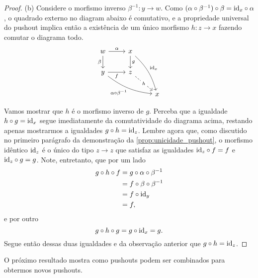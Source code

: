 \begin{proof}
    \smallskip
    (b) Considere o morfismo inverso $\beta^{-1}: y \to w$.
    Como $(\alpha \circ \beta^{-1}) \circ \beta = \mathrm{id}_x \circ \alpha$, o quadrado externo no diagram abaixo é comutativo, e a propriedade universal do pushout implica então a existência de um único morfismo $h: z \to x$ fazendo comutar o diagrama todo.
    \begin{displaymath}
        \begin{tikzcd}
            w
            \arrow[r, "\alpha"]
            \arrow[d, "\beta" swap]
            & x
            \arrow[d, "g"]
            \arrow[rdd, bend left=15, "\id_x"]
            \\ y
            \arrow[r, "f" swap]
            \arrow[rrd, bend right=15, "\alpha \circ \beta^{-1}" swap]
            & z
            \arrow[rd, dashed, "h" description]
            \\ & & x
        \end{tikzcd}
    \end{displaymath}

    Vamos mostrar que $h$ é o morfismo inverso de $g$.
    Perceba que a igualdade $h \circ g = \mathrm{id}_x$ segue imediatamente da comutatividade do diagrama acima, restando apenas mostrarmos a igualdades $g \circ h = \mathrm{id}_z$.
    Lembre agora que, como discutido no primeiro parágrafo da demonstração da \cref{prop:unicidade_pushout}, o morfismo idêntico $\mathrm{id}_z$ é o único do tipo $z \to z$ que satisfaz as igualdades $\mathrm{id}_z \circ f = f$ e $\mathrm{id}_z \circ g = g$.
    Note, entretanto, que por um lado
    \begin{align*}
        g \circ h \circ f
        & = g \circ \alpha \circ \beta^{-1} \\
        & = f \circ \beta \circ \beta^{-1} \\
        & = f \circ \mathrm{id}_y \\
        & = f,
    \end{align*}
    e por outro
    \begin{displaymath}
        g \circ h \circ g
        = g \circ \mathrm{id}_x
        = g.
    \end{displaymath}
    Segue então dessas duas igualdades e da observação anterior que $g \circ h = \mathrm{id}_z$.
 \end{proof}

 O próximo resultado mostra como pushouts podem ser combinados para obtermos novos pushouts.

